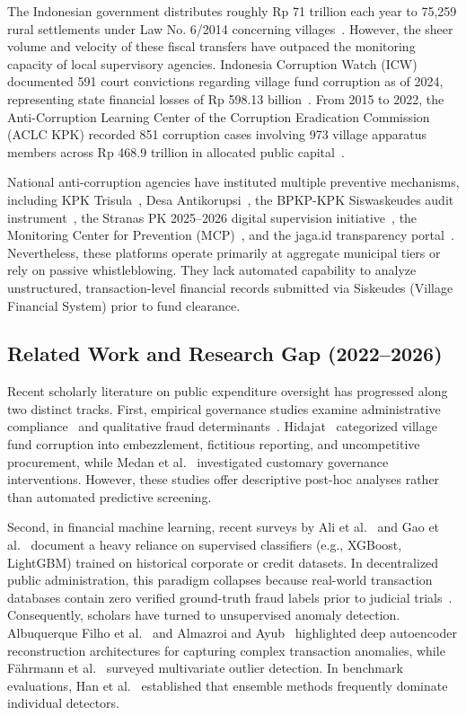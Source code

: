 \documentclass[conference]{IEEEtran}
\begin{document}
The Indonesian government distributes roughly Rp 71 trillion each year to 75,259 rural settlements under Law No. 6/2014 concerning villages~\cite{ref1}. However, the sheer volume and velocity of these fiscal transfers have outpaced the monitoring capacity of local supervisory agencies. Indonesia Corruption Watch (ICW) documented 591 court convictions regarding village fund corruption as of 2024, representing state financial losses of Rp 598.13 billion~\cite{ref2}. From 2015 to 2022, the Anti-Corruption Learning Center of the Corruption Eradication Commission (ACLC KPK) recorded 851 corruption cases involving 973 village apparatus members across Rp 468.9 trillion in allocated public capital~\cite{ref3}.

National anti-corruption agencies have instituted multiple preventive mechanisms, including KPK Trisula~\cite{ref36}, Desa Antikorupsi~\cite{ref37}, the BPKP-KPK Siswaskeudes audit instrument~\cite{ref38}, the Stranas PK 2025--2026 digital supervision initiative~\cite{ref39}, the Monitoring Center for Prevention (MCP)~\cite{ref40}, and the jaga.id transparency portal~\cite{ref26}. Nevertheless, these platforms operate primarily at aggregate municipal tiers or rely on passive whistleblowing. They lack automated capability to analyze unstructured, transaction-level financial records submitted via Siskeudes (Village Financial System) prior to fund clearance.

\subsection{Related Work and Research Gap (2022--2026)}

Recent scholarly literature on public expenditure oversight has progressed along two distinct tracks. First, empirical governance studies examine administrative compliance~\cite{ref4,ref5} and qualitative fraud determinants~\cite{ref6,ref11}. Hidajat~\cite{ref6} categorized village fund corruption into embezzlement, fictitious reporting, and uncompetitive procurement, while Medan et al.~\cite{ref15} investigated customary governance interventions. However, these studies offer descriptive post-hoc analyses rather than automated predictive screening.

Second, in financial machine learning, recent surveys by Ali et al.~\cite{ref_ali2022} and Gao et al.~\cite{ref_gao2024} document a heavy reliance on supervised classifiers (e.g., XGBoost, LightGBM) trained on historical corporate or credit datasets. In decentralized public administration, this paradigm collapses because real-world transaction databases contain zero verified ground-truth fraud labels prior to judicial trials~\cite{ref16,ref23}. Consequently, scholars have turned to unsupervised anomaly detection. Albuquerque Filho et al.~\cite{ref_albuquerque2022} and Almazroi and Ayub~\cite{ref_almazroi2023} highlighted deep autoencoder reconstruction architectures for capturing complex transaction anomalies, while Fährmann et al.~\cite{ref_fahrmann2024} surveyed multivariate outlier detection. In benchmark evaluations, Han et al.~\cite{ref_han2022adbench} established that ensemble methods frequently dominate individual detectors. 
\end{document}
